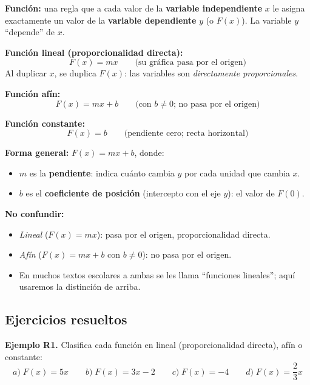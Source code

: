 \documentclass[12pt, letterpaper]{article}
\begin{document}
\begin{cuadroteoria}
  \textbf{Función:} una regla que a cada valor de la \textbf{variable independiente} $x$ le asigna exactamente un valor de la \textbf{variable dependiente} $y$ (o $F(x)$). La variable $y$ ``depende'' de $x$.

  \textbf{Función lineal (proporcionalidad directa):}
  $$F(x) = mx \qquad \text{(su gráfica pasa por el origen)}$$
  Al duplicar $x$, se duplica $F(x)$: las variables son \emph{directamente proporcionales}.

  \textbf{Función afín:}
  $$F(x) = mx + b \qquad \text{(con } b \neq 0 \text{; no pasa por el origen)}$$

  \textbf{Función constante:}
  $$F(x) = b \qquad \text{(pendiente cero; recta horizontal)}$$
\end{cuadroteoria}
\newpage
\begin{cuadroteoria}
  \textbf{Forma general:} $F(x) = mx + b$, donde:
  \begin{itemize}[leftmargin=*]
    \item $m$ es la \textbf{pendiente}: indica cuánto cambia $y$ por cada unidad que cambia $x$.
    \item $b$ es el \textbf{coeficiente de posición} (intercepto con el eje $y$): el valor de $F(0)$.
  \end{itemize}
\end{cuadroteoria}

\begin{cuadroadvertencia}
  \textbf{No confundir:}
  \begin{itemize}[leftmargin=*]
    \item \emph{Lineal} ($F(x) = mx$): pasa por el origen, proporcionalidad directa.
    \item \emph{Afín} ($F(x) = mx + b$ con $b \neq 0$): no pasa por el origen.
    \item En muchos textos escolares a ambas se les llama ``funciones lineales''; aquí usaremos la distinción de arriba.
  \end{itemize}
\end{cuadroadvertencia}

\subsection{Ejercicios resueltos}

\textbf{Ejemplo R1.} Clasifica cada función en lineal (proporcionalidad directa), afín o constante:
$$a) \; F(x) = 5x \qquad b) \; F(x) = 3x - 2 \qquad c) \; F(x) = -4 \qquad d) \; F(x) = \frac{2}{3}x$$
\end{document}

